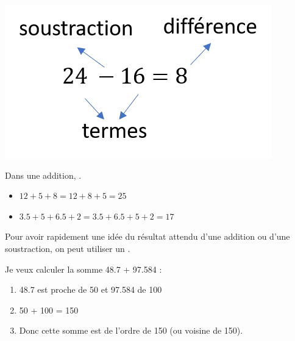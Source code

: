 {	\begin{myex}
		\begin{center}
			\includegraphics*[scale=0.7]{img/difference}
		\end{center}
	\end{myex}


	\begin{myprop}
		Dans une addition, .
	\end{myprop}

	\begin{myex}
		\begin{itemize}
			\item $12 + 5 + 8 = 12 + 8 + 5 = 25$
			\item $\num{3.5} + 5 + \num{6.5} + 2 = \num{3.5} + \num{6.5} + 5 + 2 = 17$
		\end{itemize}
	\end{myex}

	\begin{mymeth}
		Pour avoir rapidement une idée du résultat attendu d'une addition ou d'une soustraction, on peut utiliser un .		
	\end{mymeth}

	\begin{myex}
		Je veux calculer la somme \num{48.7} + \num{97.584} : 
		\begin{enumerate}
			\item \num{48.7} est proche de 50 et \num{97.584} de 100
			\item 50 + 100 = 150
			\item Donc cette somme est de l'ordre de 150 (ou voisine de 150).
		\end{enumerate}
	\end{myex}

}